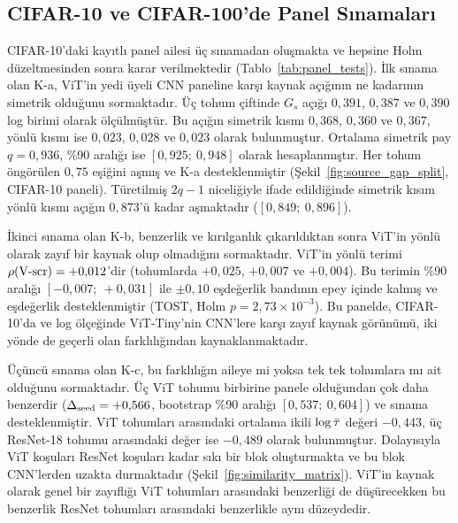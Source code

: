\subsection{CIFAR-10 ve CIFAR-100'de Panel Sınamaları}
\label{subsec:panel}

CIFAR-10'daki kayıtlı panel ailesi üç sınamadan oluşmakta ve hepsine Holm düzeltmesinden sonra karar verilmektedir (Tablo~\ref{tab:panel_tests}). İlk sınama olan K-a, ViT'in yedi üyeli CNN paneline karşı kaynak açığının ne kadarının simetrik olduğunu sormaktadır. Üç tohum çiftinde $G_s$ açığı $0{,}391$, $0{,}387$ ve $0{,}390$ log birimi olarak ölçülmüştür. Bu açığın simetrik kısmı $0{,}368$, $0{,}360$ ve $0{,}367$, yönlü kısmı ise $0{,}023$, $0{,}028$ ve $0{,}023$ olarak bulunmuştur. Ortalama simetrik pay $q = 0{,}936$, \%90 aralığı ise $[0{,}925;\ 0{,}948]$ olarak hesaplanmıştır. Her tohum öngörülen $0{,}75$ eşiğini aşmış ve K-a desteklenmiştir (Şekil~\ref{fig:source_gap_split}, CIFAR-10 paneli). Türetilmiş $2q - 1$ niceliğiyle ifade edildiğinde simetrik kısım yönlü kısmı açığın $0{,}873$'ü kadar aşmaktadır ($[0{,}849;\ 0{,}896]$).

İkinci sınama olan K-b, benzerlik ve kırılganlık çıkarıldıktan sonra ViT'in yönlü olarak zayıf bir kaynak olup olmadığını sormaktadır. ViT'in yönlü terimi $\rho(\mbox{V-scr}) = +0{,}012$'dir (tohumlarda $+0{,}025$, $+0{,}007$ ve $+0{,}004$). Bu terimin \%90 aralığı $[-0{,}007;\ +0{,}031]$ ile $\pm0{,}10$ eşdeğerlik bandının epey içinde kalmış ve eşdeğerlik desteklenmiştir (TOST, Holm $p = 2{,}73\times10^{-3}$). Bu panelde, CIFAR-10'da ve log ölçeğinde ViT-Tiny'nin CNN'lere karşı zayıf kaynak görünümü, iki yönde de geçerli olan farklılığından kaynaklanmaktadır.

Üçüncü sınama olan K-c, bu farklılığın aileye mi yoksa tek tek tohumlara mı ait olduğunu sormaktadır. Üç ViT tohumu birbirine panele olduğundan çok daha benzerdir ($\Delta_{\mathrm{seed}} = +0{,}566$, bootstrap \%90 aralığı $[0{,}537;\ 0{,}604]$) ve sınama desteklenmiştir. ViT tohumları arasındaki ortalama ikili $\log\bar{\tau}$ değeri $-0{,}443$, üç ResNet-18 tohumu arasındaki değer ise $-0{,}489$ olarak bulunmuştur. Dolayısıyla ViT koşuları ResNet koşuları kadar sıkı bir blok oluşturmakta ve bu blok CNN'lerden uzakta durmaktadır (Şekil~\ref{fig:similarity_matrix}). ViT'in kaynak olarak genel bir zayıflığı ViT tohumları arasındaki benzerliği de düşürecekken bu benzerlik ResNet tohumları arasındaki benzerlikle aynı düzeydedir.

